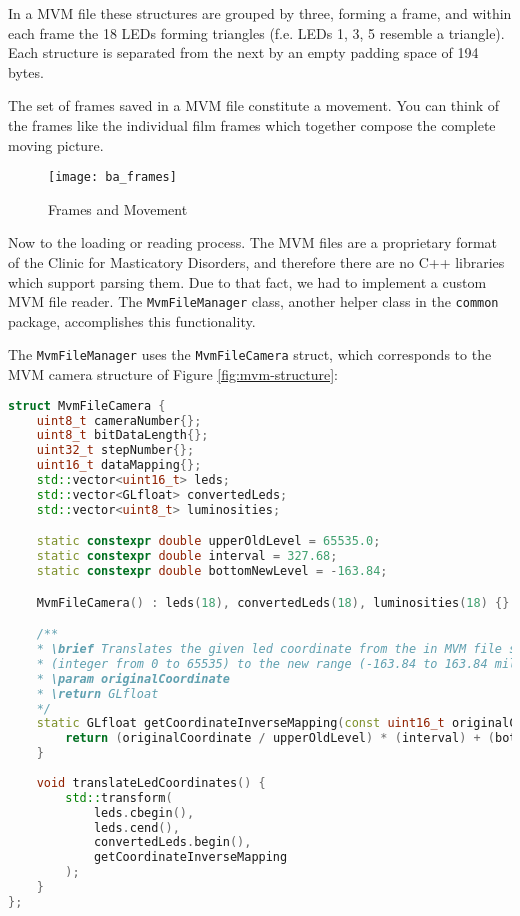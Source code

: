 In a MVM file these structures are grouped by three, forming a \gls{frame}, and within each frame the 18 LEDs forming triangles (f.e. LEDs 1, 3, 5 resemble a triangle). Each structure is separated from the next by an empty padding space of 194 bytes. 

The set of frames saved in a MVM file constitute a movement. You can think of the frames like the individual film frames which together compose the complete moving picture.

\begin{figure}[h!]
	\centering
	\texttt{[image: ba\_frames]}
	\caption{Frames and Movement}
\end{figure}


 \label{reading-mvm-files}

Now to the loading or reading process. The MVM files are a proprietary format of the Clinic for Masticatory Disorders, and therefore there are no C++ libraries which support parsing them. Due to that fact, we had to implement a custom MVM file reader. The \verb|MvmFileManager| class, another helper class in the \verb|common| package, accomplishes this functionality.

\noindent The \verb|MvmFileManager| uses the \verb|MvmFileCamera| struct, which corresponds to the MVM camera structure of Figure \ref{fig:mvm-structure}:


\begin{lstlisting}[language=C++,caption={The MvmFileCamera struct},label={code:mvmfilecamera}]
struct MvmFileCamera {
	uint8_t cameraNumber{};
	uint8_t bitDataLength{};
	uint32_t stepNumber{};
	uint16_t dataMapping{};
	std::vector<uint16_t> leds;
	std::vector<GLfloat> convertedLeds;
	std::vector<uint8_t> luminosities;

	static constexpr double upperOldLevel = 65535.0;
	static constexpr double interval = 327.68;
	static constexpr double bottomNewLevel = -163.84;

	MvmFileCamera() : leds(18), convertedLeds(18), luminosities(18) {}

	/**
	* \brief Translates the given led coordinate from the in MVM file saved format 
	* (integer from 0 to 65535) to the new range (-163.84 to 163.84 millimeter)
	* \param originalCoordinate
	* \return GLfloat
	*/
	static GLfloat getCoordinateInverseMapping(const uint16_t originalCoordinate) {
		return (originalCoordinate / upperOldLevel) * (interval) + (bottomNewLevel);
	}
	
	void translateLedCoordinates() {
		std::transform(
			leds.cbegin(), 
			leds.cend(), 
			convertedLeds.begin(),
			getCoordinateInverseMapping
		);
	}
};
\end{lstlisting}

